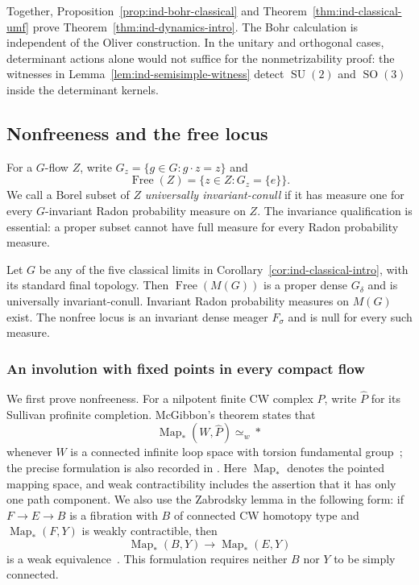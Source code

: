 Together, Proposition~\ref{prop:ind-bohr-classical} and
Theorem~\ref{thm:ind-classical-umf} prove
Theorem~\ref{thm:ind-dynamics-intro}. The Bohr calculation is independent
of the Oliver construction. In the unitary and orthogonal cases,
determinant actions alone would not suffice for the nonmetrizability
proof: the witnesses in Lemma~\ref{lem:ind-semisimple-witness} detect
$\operatorname{SU}(2)$ and $\operatorname{SO}(3)$ inside the determinant kernels.


\subsection{Nonfreeness and the free locus}\label{sec:ind-free-locus}

For a $G$-flow $Z$, write $G_z=\{g\in G:g\cdot z=z\}$ and
\[
\operatorname{Free}(Z)=\{z\in Z:G_z=\{e\}\}.
\]
We call a Borel subset of $Z$ \emph{universally invariant-conull} if
it has measure one for every $G$-invariant Radon probability measure
on $Z$. The invariance qualification is essential: a proper subset
cannot have full measure for every Radon probability measure.

\begin{theorem}\label{thm:ind-classical-free-locus}
Let $G$ be any of the five classical limits in
Corollary~\ref{cor:ind-classical-intro}, with its standard final topology.
Then $\operatorname{Free}(M(G))$ is a proper dense $G_\delta$ and is
universally invariant-conull. Invariant Radon probability measures
on $M(G)$ exist. The nonfree locus is an invariant dense meager
$F_\sigma$ and is null for every such measure.
\end{theorem}


\subsubsection{An involution with fixed points in every compact flow}

We first prove nonfreeness. For a nilpotent finite CW complex $P$,
write $\widehat P$ for its Sullivan profinite completion.
McGibbon's theorem states that
\begin{equation}\label{eq:ind-mcgibbon-null}
\operatorname{Map}_*(W,\widehat P)\simeq_w *
\end{equation}
whenever $W$ is a connected infinite loop space with torsion
fundamental group~\cite[Theorem~3]{McGibbon1996}; the precise
formulation is also recorded in
\cite[Example~1.6(iii), p.~68]{KiharaOda2012}.
Here $\operatorname{Map}_*$ denotes the pointed mapping space,
and weak contractibility includes the assertion that it has only
one path component. We also use the Zabrodsky lemma in the following
form: if $F\to E\to B$ is a fibration with $B$ of connected CW
homotopy type and $\operatorname{Map}_*(F,Y)$ is weakly contractible,
then
\begin{equation}\label{eq:ind-zabrodsky-mapping}
\operatorname{Map}_*(B,Y)\longrightarrow\operatorname{Map}_*(E,Y)
\end{equation}
is a weak equivalence~\cite[Lemma~2.1]{CenceljEtAl2007}.
This formulation requires neither $B$ nor $Y$ to be simply connected.

